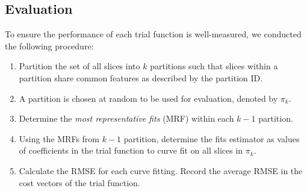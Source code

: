 \documentclass[11pt]{article}
\begin{document}

\subsection{Evaluation}
To ensure the performance of each trial function is well-measured, we conducted the following procedure:
\begin{enumerate}
    \item Partition the set of all slices into $k$ partitions such that 
    slices within a partition share common features as described by the partition ID. 
    \item A partition is chosen at random to be used for evaluation, denoted by $\pi_k$.
    \item Determine the \textit{most representative fits} (MRF) within each $k-1$ partition.
    \item Using the MRFs from $k-1$ partition, determine the fits estimator as values of coefficients in the trial function to curve fit on all slices in $\pi_k$.
    \item Calculate the RMSE for each curve fitting. Record the average RMSE in the %
    cost vectors of the trial function.
\end{enumerate}
\end{document}
